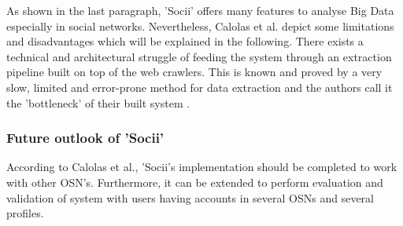 As shown in the last paragraph, 'Socii' offers many features to analyse Big Data especially in social networks. Nevertheless, Calolas et al. depict some limitations and disadvantages which will be explained in the following. 
There exists a technical and architectural struggle of feeding the system through an extraction pipeline built on top of the web crawlers. This is known and proved by a very slow, limited and error-prone method for data extraction and the authors call it the 'bottleneck' of their built system \cite [p.227]{trends_nosql}. 

\subsubsection{Future outlook of 'Socii'}

According to Calolas et al., 'Socii's implementation should be completed to work with other OSN's. Furthermore, it can be extended to perform evaluation and validation of system with users having accounts in several OSNs and several profiles. 

